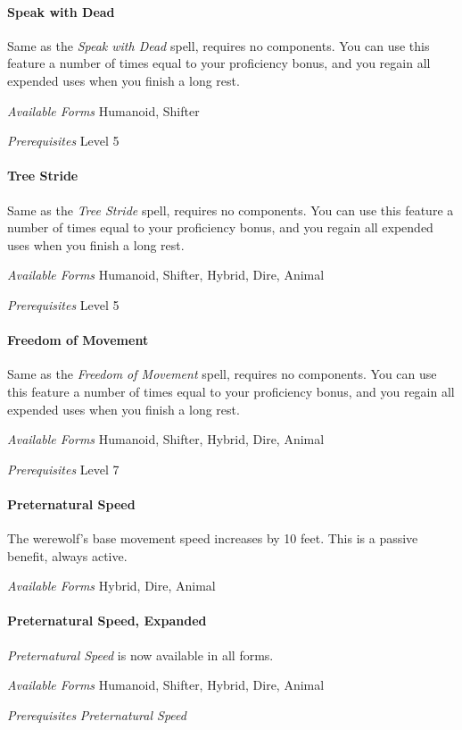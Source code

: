 \documentclass[twocolumn]{dndbook}
\begin{document}
\paragraph*{Speak with Dead}
Same as the \emph{Speak with Dead} spell, requires no components.
You can use this feature a number of times equal to your proficiency bonus, and you regain all expended uses when you finish a long rest.\par
\emph{Available Forms} Humanoid, Shifter\par
\emph{Prerequisites} Level 5\par

\paragraph*{Tree Stride}
Same as the \emph{Tree Stride} spell, requires no components.
You can use this feature a number of times equal to your proficiency bonus, and you regain all expended uses when you finish a long rest.\par
\emph{Available Forms} Humanoid, Shifter, Hybrid, Dire, Animal\par
\emph{Prerequisites} Level 5\par

\paragraph*{Freedom of Movement}
Same as the \emph{Freedom of Movement} spell, requires no components.
You can use this feature a number of times equal to your proficiency bonus, and you regain all expended uses when you finish a long rest.\par
\emph{Available Forms} Humanoid, Shifter, Hybrid, Dire, Animal\par
\emph{Prerequisites} Level 7\par

\paragraph*{Preternatural Speed}
The werewolf's base movement speed increases by 10 feet. This is a passive benefit, always active.\par
\emph{Available Forms} Hybrid, Dire, Animal\par

\paragraph*{Preternatural Speed, Expanded}
\emph{Preternatural Speed} is now available in all forms.\par
\emph{Available Forms} Humanoid, Shifter, Hybrid, Dire, Animal\par
\emph{Prerequisites} \emph{Preternatural Speed}\par
\end{document}
